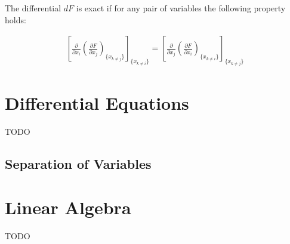 \documentclass{article}
\numberwithin{theorem}{subsection}
\numberwithin{theorem}{subsubsection}
\theoremstyle{definition}
\numberwithin{definition}{subsection}
\numberwithin{definition}{subsubsection}
\begin{document}
The differential $dF$ is exact if for any pair of variables the following property holds:

\begin{gather*}
    \left [ \frac{\partial}{\partial x_{i}}\left ( \frac{\partial F}{\partial x_{j}} \right )_{\{x_{k \neq j}\}}\right ]_{\{x_{k \neq i}\}} = \left [ \frac{\partial}{\partial x_{j}}\left ( \frac{\partial F}{\partial x_{i}} \right )_{\{x_{k \neq i}\}}\right ]_{\{x_{k \neq j}\}}
\end{gather*}

\begin{comment}
======================================================================================================================================================================================================================================================================================DIFFERENTIAL EQUATIONS=================================================== ====================================================================================================================================================================================================================================
\end{comment}

\section{Differential Equations}

TODO 
\subsection{Separation of Variables}

\begin{comment}
=================================================================================================================================================================================================================================================================== LINEAR ALGEBRA ================================================= ====================================================================================================================================================================================================================================
\end{comment}

\section{Linear Algebra}
 TODO
\end{document}
